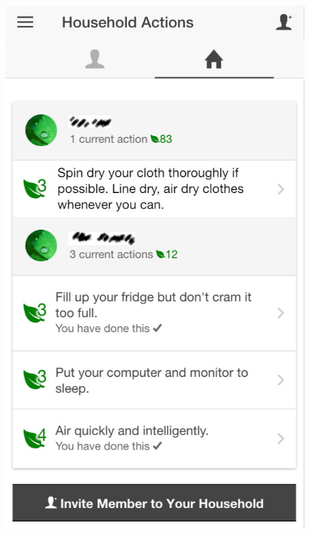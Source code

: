 \begin{figure}
      \begin{center}
      \begin{minipage}[t!]{0.33\linewidth}    
               \includegraphics[width=1\linewidth]{img/house2.jpg}    
       \end{minipage}
        \begin{minipage}[t!]{0.33\linewidth}

\end{minipage}
\end{center}
\end{figure}
